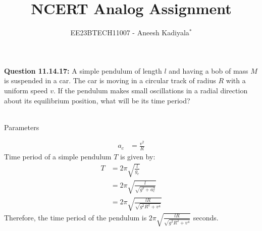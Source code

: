 \documentclass[journal,12pt,twocolumn]{IEEEtran}
\theoremstyle{remark}
\begin{document}

\vspace{3cm}

\title{NCERT Analog Assignment}
\author{EE23BTECH11007 - Aneesh Kadiyala$^{*}$%
}
\maketitle
\newpage
\bigskip

\renewcommand{\thefigure}{\theenumi}
\renewcommand{\thetable}{\theenumi}

\vspace{3cm}
\textbf{Question 11.14.17:} A simple pendulum of length $l$ and having a bob of mass $M$ is suspended in a car. The car is moving in a circular track of radius $R$ with a uniform speed $v$. If the pendulum makes small oscillations in a radial direction about its equilibrium position, what will be its time period?
\\
\solution
\\
\begin{table}[h!]
    \centering
    \caption{Parameters}
    \label{tab:1}
    
\end{table}

\begin{align}
a_c &= \frac{v^2}{R}
\end{align}
Time period of a simple pendulum $T$ is given by:
\begin{align}
T &= 2\pi\sqrt{\frac{l}{g_{e}}} \\
&= 2\pi\sqrt{\frac{l}{\sqrt{g^2 + a_c^2}}} \\
&= 2\pi\sqrt{\frac{lR}{\sqrt{g^2R^2 + v^4}}}
\end{align}
Therefore, the time period of the pendulum is $2\pi\sqrt{\frac{lR}{\sqrt{g^2R^2 + v^4}}}$ seconds.
\end{document}
